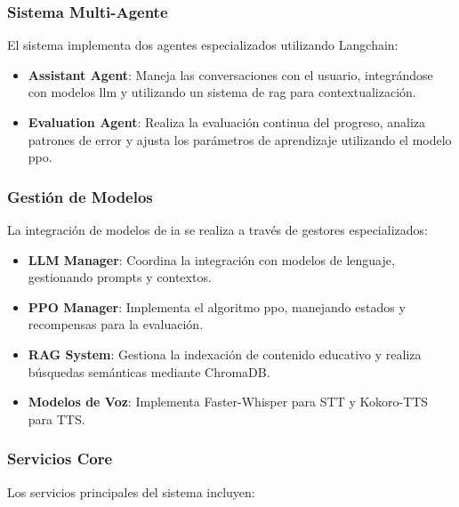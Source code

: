 \subsubsection{Sistema Multi-Agente}
\label{sistema-multi-agente}

El sistema implementa dos agentes especializados utilizando Langchain:

\begin{itemize}
    \item \textbf{Assistant Agent}: Maneja las conversaciones con el usuario, integrándose con modelos \gls{llm} y utilizando un sistema de \gls{rag} para contextualización.
    
    \item \textbf{Evaluation Agent}: Realiza la evaluación continua del progreso, analiza patrones de error y ajusta los parámetros de aprendizaje utilizando el modelo \gls{ppo}.
\end{itemize}

\subsubsection{Gestión de Modelos}
\label{gestion-modelos}

La integración de modelos de \gls{ia} se realiza a través de gestores especializados:

\begin{itemize}
    \item \textbf{LLM Manager}: Coordina la integración con modelos de lenguaje, gestionando prompts y contextos.
    
    \item \textbf{PPO Manager}: Implementa el algoritmo \gls{ppo}, manejando estados y recompensas para la evaluación.
    
    \item \textbf{RAG System}: Gestiona la indexación de contenido educativo y realiza búsquedas semánticas mediante ChromaDB.
    
    \item \textbf{Modelos de Voz}: Implementa Faster-Whisper para STT y Kokoro-TTS para TTS.
\end{itemize}

\subsubsection{Servicios Core}
\label{servicios-core}

Los servicios principales del sistema incluyen:

